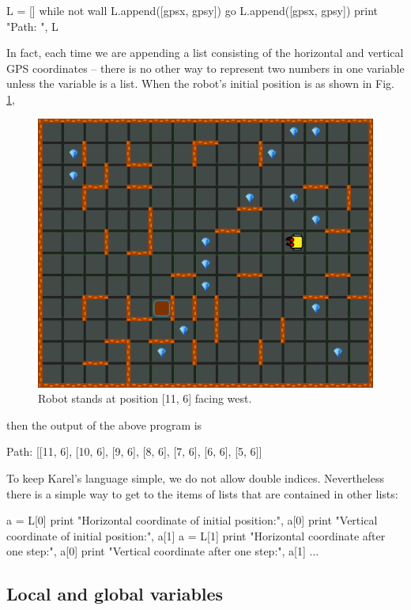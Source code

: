 \begin{bluecode}
L = []
while not wall
    L.append([gpsx, gpsy])
    go
L.append([gpsx, gpsy])
print "Path: ", L
\end{bluecode}
In fact, each time we are appending a list consisting of the horizontal and 
vertical GPS coordinates -- there is no other way to represent two numbers 
in one variable unless the variable is a list. When the robot's initial position 
is as shown in Fig. \ref{fig:list-1},

\begin{figure}[!ht]
\begin{center}
\includegraphics[height=0.4\textwidth]{imgk/lists-1.png}
\vspace{-0mm}
\caption{Robot stands at position [11, 6] facing west.}
\label{fig:list-1}
\end{center}
\end{figure}

\noindent
then the output of the above program is

\begin{bluecode}
Path: [[11, 6], [10, 6], [9, 6], [8, 6], [7, 6], [6, 6], [5, 6]]
\end{bluecode}
To keep Karel's language simple, we do not allow double indices. Nevertheless
there is a simple way to get to the items of lists that are contained in other lists:

\begin{bluecode}
a = L[0]
print "Horizontal coordinate of initial position:", a[0]
print "Vertical coordinate of initial position:", a[1]
a = L[1]
print "Horizontal coordinate after one step:", a[0]
print "Vertical coordinate after one step:", a[1]
...
\end{bluecode}

\subsection{Local and global variables}\label{subsec:karellocvar}

